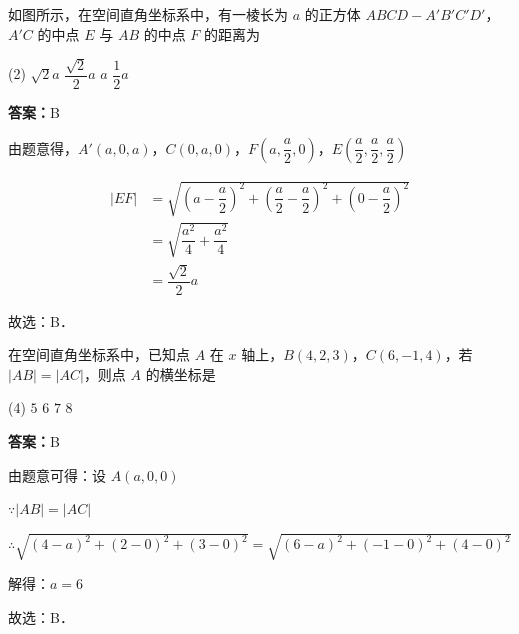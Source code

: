 \begin{example}[\bkstar{2}{5}]
如图所示，在空间直角坐标系中，有一棱长为 $a$ 的正方体 $ABCD-A'B'C'D'$，$A'C$ 的中点 $E$ 与 $AB$ 的中点 $F$ 的距离为
\begin{tasks}(2)
    \task $\sqrt{2}a$
    \task $\dfrac{\sqrt{2}}{2}a$
    \task $a$
    \task $\dfrac{1}{2}a$
\end{tasks}
\end{example}
\begin{solution}
\textbf{答案：}B

由题意得，$A'(a,0,a)$，$C(0,a,0)$，$F\left(a,\dfrac{a}{2},0\right)$，$E\left(\dfrac{a}{2},\dfrac{a}{2},\dfrac{a}{2}\right)$

\begin{align*}
|EF|&=\sqrt{\left(a-\dfrac{a}{2}\right)^2+\left(\dfrac{a}{2}-\dfrac{a}{2}\right)^2+\left(0-\dfrac{a}{2}\right)^2}\\
&=\sqrt{\dfrac{a^2}{4}+\dfrac{a^2}{4}}\\
&=\dfrac{\sqrt{2}}{2}a
\end{align*}

故选：B．
\end{solution}

\vspace{2em}

\begin{example}[\bkstar{2}{5}]
在空间直角坐标系中，已知点 $A$ 在 $x$ 轴上，$B(4,2,3)$，$C(6,-1,4)$，若 $|AB|=|AC|$，则点 $A$ 的横坐标是
\begin{tasks}(4)
    \task $5$
    \task $6$
    \task $7$
    \task $8$
\end{tasks}
\end{example}
\begin{solution}
\textbf{答案：}B

由题意可得：设 $A(a,0,0)$

$\because |AB|=|AC|$

$\therefore \sqrt{(4-a)^2+(2-0)^2+(3-0)^2}=\sqrt{(6-a)^2+(-1-0)^2+(4-0)^2}$

解得：$a=6$

故选：B．
\end{solution}

\vspace{2em}

